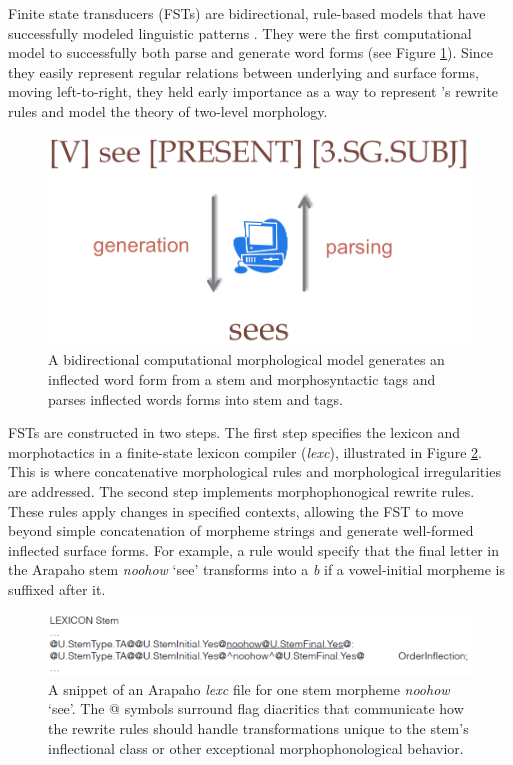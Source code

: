 \documentclass[12pt]{article}
\begin{document}
Finite state transducers (FSTs) are bidirectional, rule-based models that have successfully modeled linguistic patterns \cite{koskenniemi_two-level_1983,beesley_finite-state_2003,hulden_finite-state_2009}. They were the first computational model to successfully both parse and generate word forms \cite{goodman_generation_2013} (see Figure \ref{fig:bidir}). Since they easily represent regular relations between underlying and surface forms, moving left-to-right, they held early importance as a way to represent 's  rewrite rules \cite{karttunen_2005} and model the theory of two-level morphology.
\bigskip

\begin{figure}[ht]
\begin{center}
\includegraphics[width=0.5\columnwidth]{bidirectional.PNG}
\caption{A bidirectional computational morphological model generates an inflected word form from a stem and morphosyntactic tags and parses inflected words forms into stem and tags.}
\label{fig:bidir}
\end{center}
\end{figure}

FSTs are constructed in two steps. The first step specifies the lexicon and morphotactics in a finite-state lexicon compiler ({\it lexc}), illustrated in Figure \ref{fig:lexc}. This is where concatenative morphological rules and morphological irregularities are addressed. The second step implements morphophonogical rewrite rules. These rules apply changes in specified contexts, allowing the FST to move beyond simple concatenation of morpheme strings and generate well-formed inflected surface forms. For example, a rule would specify that the final letter in the Arapaho stem \textit{noohow} `see' transforms into a \textit{b} if a vowel-initial morpheme is suffixed after it.
\bigskip
\begin{figure}[ht]
\begin{center}
\includegraphics[width=0.95\columnwidth]{FSTlexicon.PNG}
\caption{A snippet of an Arapaho \textit{lexc} file for one stem morpheme \textit{noohow} `see'. The @ symbols surround flag diacritics that communicate how the rewrite rules should handle transformations unique to the stem's inflectional class or other exceptional morphophonological behavior.}
\label{fig:lexc}
\end{center}
\end{figure}
\end{document}
